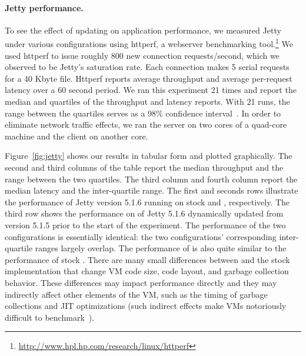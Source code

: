% 
% 
% 

\paragraph{Jetty performance.}
To see the effect of updating on application performance, we measured Jetty
under various configurations using httperf, a webserver
benchmarking tool.\footnote{\url{http://www.hpl.hp.com/research/linux/httperf}}  We used httperf to issue roughly 800 new connection
requests/second, which we observed to be Jetty's saturation rate.
Each connection makes 5 serial requests for a 40 Kbyte file. Httperf
reports average throughput and average per-request latency over a 60 second period. We
ran this experiment 21 times and report the median and
quartiles of the throughput and latency reports. With 21 runs, the range between
the quartiles serves as a 98\% conﬁdence interval~\cite{PrattGibbons81}.
In order to eliminate network traffic
effects, we ran the server on two cores of a quad-core machine and the
client on another core.

Figure~\ref{fig:jetty} shows our results in tabular form and plotted graphically.  The second and third columns
of the table
report the median throughput and the range between the two quartiles.
The third column and fourth column report the median latency and the
inter-quartile range.  The
first and seconds rows illustrate the performance of Jetty version 5.1.6
running on stock \JikesRVM{} and \DSU, respectively. The third row shows
the performance on \DSU{} of Jetty 5.1.6 dynamically updated from version
5.1.5 prior to the start of the experiment.
The performance of the two \DSU{} configurations
is essentially identical: the two configurations' corresponding
inter-quartile ranges largely overlap.
The performance of \DSU{} is also quite similar to the performance of
stock \JikesRVM.  There are many small differences between \DSU{} and the stock
implementation that change VM code size, code layout, and garbage
collection behavior.  These differences may impact performance
directly and they may indirectly affect other elements of the VM,
such as the timing of garbage collections and JIT
optimizations (such indirect effects make VMs notoriously difficult to
benchmark~\cite{dacapo-cacm}).


